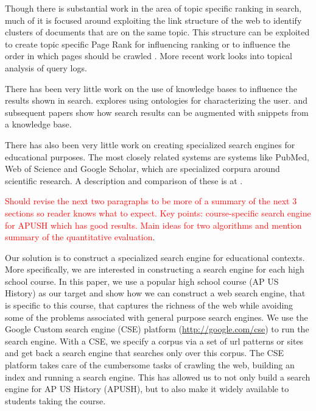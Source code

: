 \documentclass[pdfpagelabels=false,plainpages=true]{acm_proc_article-sp}
\begin{document}
Though there is substantial work in the area of topic specific ranking in
search, much of it is focused around exploiting the link structure of the web
to identify clusters of documents that are on the same topic. This structure
can be exploited to create topic specific Page Rank \cite{haveliwala2003topic}
for influencing ranking or to influence the order in which pages should be
crawled \cite{hsu2006topic,buntine2004scalable}. More recent work
\cite{bar2009topic} looks into topical analysis of query logs.  

 There has been very little work on the use of knowledge bases to influence the
 results shown in search. \cite{jiang2009learning} explores using ontologies for characterizing the 
user. \cite{guha2003semantic} and subsequent papers show how search results can
be augmented with snippets from a knowledge base.  

There has also been very little work on creating specialized search
engines for educational purposes. The most closely related systems are systems
like PubMed, Web of Science and Google Scholar, which are specialized 
corpura around scientific research. A description and comparison of 
these is at \cite{jacso2005google}.   

\textcolor{red}{Should revise the next two paragraphs to be more of a summary of
the next 3 sections so reader knows what to expect. Key points: course-specific
search engine for APUSH which has good results. Main ideas for two algorithms
and mention summary of the quantitative evaluation}.

Our solution is to construct a specialized search engine for
educational contexts. More specifically, we are interested in constructing a
search engine for each high school course. In this paper, we use a popular high
school course (AP US History) as our target and show how we can construct a web
search engine, that is specific to this course, that captures the richness of
the web while avoiding some of the problems associated with general purpose
search engines. We use the Google Custom search engine (CSE) platform
(\url{http://google.com/cse}) to run the search engine. With a CSE, we
specify a corpus via a set of url patterns or sites and get back a search engine
that searches only over this corpus. The CSE platform takes care of the
cumbersome tasks of crawling the web, building an index and running a search
engine. This has allowed us to not only build a search engine for AP US History
(APUSH), but to also make it widely available to students taking the course. 
\end{document}
